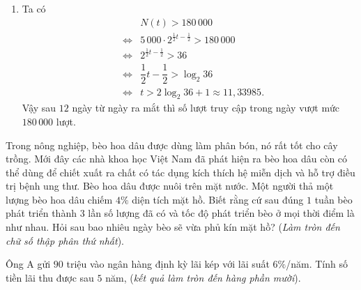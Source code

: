 \begin{bt}
{\begin{enumerate}
			\item Ta có 
			\allowdisplaybreaks
			\begin{eqnarray*}
				&& N(t) > 180\,000 \\
				&\Leftrightarrow& 5\,000\cdot 2^{\tfrac{1}{2}t-\tfrac{1}{2}} > 180\, 000 \\
				&\Leftrightarrow& 2^{\tfrac{1}{2}t-\tfrac{1}{2}} > 36 \\
				&\Leftrightarrow& \dfrac{1}{2}t - \dfrac{1}{2} > \log_2 36 \\
				&\Leftrightarrow& t > 2\log_2 36 + 1\approx 11{,}33985.
			\end{eqnarray*}
			Vậy sau $12$ ngày từ ngày ra mắt thì số lượt truy cập trong ngày vượt mức $180\,000$ lượt.
		\end{enumerate}
	}
\end{bt}

\begin{bt}%
	 		Trong nông nghiệp, bèo hoa dâu được dùng làm phân bón, nó rất tốt cho cây trồng. Mới đây các nhà khoa học Việt Nam đã phát hiện ra bèo hoa dâu còn có thể dùng để chiết xuất ra chất có tác dụng kích thích hệ miễn dịch và hỗ trợ điều trị bệnh ung thư. Bèo hoa dâu được nuôi trên mặt nước. Một người thả một lượng bèo hoa dâu chiếm $4\%$ diện tích mặt hồ. Biết rằng cứ sau đúng $1$ tuần bèo phát triển thành $3$ lần số lượng đã có và tốc độ phát triển bèo ở mọi thời điểm là như nhau. Hỏi sau bao nhiêu ngày bèo sẽ vừa phủ kín mặt hồ? (\textit{Làm tròn đến chữ số thập phân thứ nhất}).
	 	\end{bt}

\begin{bt}%
	 			Ông A gửi $90$ triệu vào ngân hàng định kỳ lãi kép với lãi suất $6\%$/năm. Tính số tiền lãi thu được sau $5$ năm, (\textit{kết quả làm tròn đến hàng phần mười}).
	 	\end{bt}

